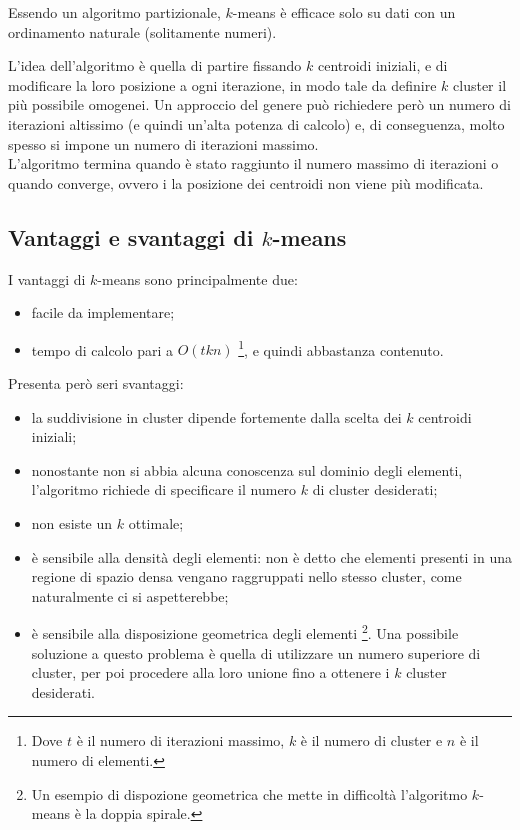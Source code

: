Essendo un algoritmo partizionale, $k$-means è efficace solo su dati con un ordinamento naturale (solitamente numeri).

L'idea dell'algoritmo è quella di partire fissando $k$ centroidi iniziali, e di modificare la loro posizione a ogni iterazione, in modo tale da definire $k$ cluster il più possibile omogenei.
Un approccio del genere può richiedere però un numero di iterazioni altissimo (e quindi un'alta potenza di calcolo) e, di conseguenza, molto spesso si impone un numero di iterazioni massimo.\\
L'algoritmo termina quando è stato raggiunto il numero massimo di iterazioni o quando converge, ovvero i la posizione dei centroidi non viene più modificata.

\subsection{Vantaggi e svantaggi di $k$-means}
I vantaggi di $k$-means sono principalmente due:
\begin{itemize}
    \item facile da implementare;
    \item tempo di calcolo pari a $O(tkn)$ \footnote{Dove $t$ è il numero di iterazioni massimo, $k$ è il numero di cluster e $n$ è il numero di elementi.}, e quindi abbastanza contenuto. 
\end{itemize}
Presenta però seri svantaggi:
\begin{itemize}
    \item la suddivisione in cluster dipende fortemente dalla scelta dei $k$ centroidi iniziali;
    \item nonostante non si abbia alcuna conoscenza sul dominio degli elementi, l'algoritmo richiede di specificare il numero $k$ di cluster desiderati;
    \item non esiste un $k$ ottimale;
    \item è sensibile alla densità degli elementi: non è detto che elementi presenti in una regione di spazio densa vengano raggruppati nello stesso cluster, come naturalmente ci si aspetterebbe;
    \item è sensibile alla disposizione geometrica degli elementi \footnote{Un esempio di dispozione geometrica che mette in difficoltà l'algoritmo $k$-means è la doppia spirale.}. Una possibile soluzione a questo problema è quella di utilizzare un numero superiore di cluster, per poi procedere alla loro unione fino a ottenere i $k$ cluster desiderati.
\end{itemize}

